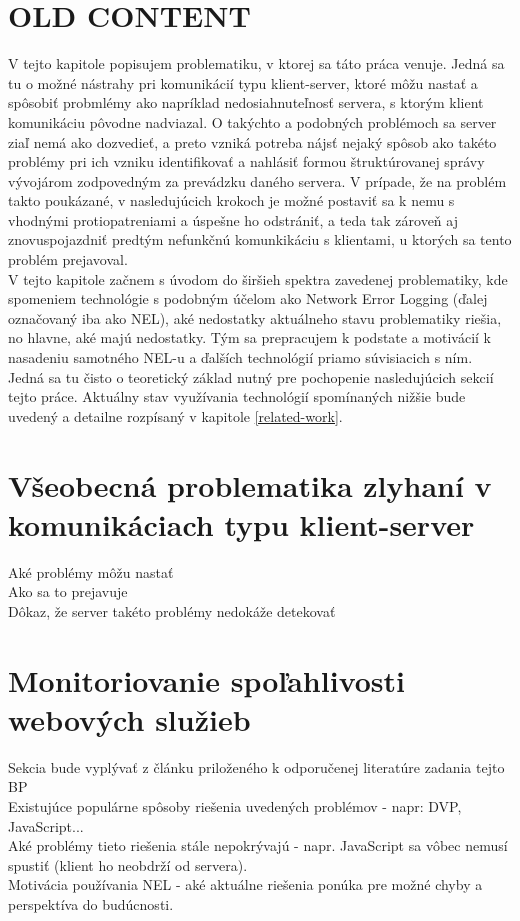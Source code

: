 \section{OLD CONTENT}
V tejto kapitole popisujem problematiku, v ktorej sa táto práca venuje. Jedná sa tu o možné nástrahy pri komunikácií typu klient-server,
ktoré môžu nastať a spôsobiť probmlémy ako napríklad nedosiahnuteľnosť servera, s ktorým klient komunikáciu pôvodne nadviazal.
O takýchto a podobných problémoch sa server ziaľ nemá ako dozvedieť, a preto vzniká potreba nájsť nejaký spôsob ako takéto problémy pri ich
vzniku identifikovať a nahlásiť formou štruktúrovanej správy vývojárom zodpovedným za prevádzku daného servera. V prípade, že 
na problém takto poukázané, v nasledujúcich krokoch je možné postaviť sa k nemu s vhodnými protiopatreniami a úspešne ho odstrániť, a teda 
tak zároveň aj znovuspojazdniť predtým nefunkčnú komunkikáciu s klientami, u ktorých sa tento problém prejavoval.
\\
V tejto kapitole začnem s úvodom do širšieh spektra zavedenej problematiky, kde spomeniem technológie s podobným účelom 
ako Network Error Logging (ďalej označovaný iba ako NEL), aké nedostatky aktuálneho stavu problematiky riešia, no hlavne, aké majú nedostatky. 
Tým sa prepracujem k podstate a motivácií k nasadeniu samotného NEL-u a ďalších technológií priamo súvisiacich s ním. 
Jedná sa tu čisto o teoretický základ nutný pre pochopenie nasledujúcich sekcií tejto práce. 
Aktuálny stav využívania technológií spomínaných nižšie bude uvedený a detailne rozpísaný v kapitole \ref{related-work}.

\section{Všeobecná problematika zlyhaní v komunikáciach typu klient-server}

Aké problémy môžu nastať
\\
Ako sa to prejavuje
\\
Dôkaz, že server takéto problémy nedokáže detekovať

\section{Monitoriovanie spoľahlivosti webových služieb}

Sekcia bude vyplývať z článku priloženého k odporučenej literatúre zadania tejto BP \cite{nel-client-side-measurement-e2e-reliability}
\\
Existujúce populárne spôsoby riešenia uvedených problémov - napr: DVP, JavaScript...
\\
Aké problémy tieto riešenia stále nepokrývajú - napr. JavaScript sa vôbec nemusí spustiť (klient ho neobdrží od servera).
\\
Motivácia používania NEL - aké aktuálne riešenia ponúka pre možné chyby a perspektíva do budúcnosti.

